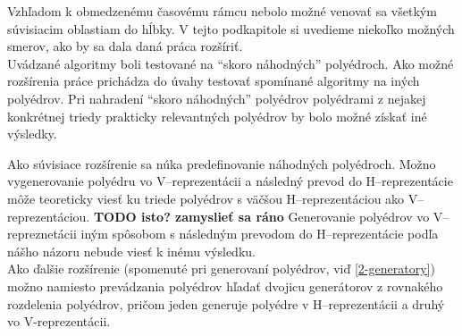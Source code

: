 Vzhľadom k obmedzenému časovému rámcu nebolo možné venovať sa všetkým súvisiacim oblastiam do hĺbky. V tejto podkapitole si uvedieme niekoľko možných smerov, ako by sa dala daná práca rozšíriť.\\

Uvádzané algoritmy boli testované na ``skoro náhodných'' polyédroch. Ako možné rozšírenia práce prichádza do úvahy testovať spomínané algoritmy na iných polyédrov. Pri nahradení ``skoro náhodných'' polyédrov polyédrami z nejakej konkrétnej triedy prakticky relevantných polyédrov by bolo možné získať iné výsledky. 

Ako súvisiace rozšírenie sa núka predefinovanie náhodných polyédroch. Možno vygenerovanie polyédru vo V--reprezentácii a následný prevod do H--reprezentácie môže teoreticky viesť ku triede polyédrov s väčšou H--reprezentáciou ako V--reprezentáciou. \textbf{TODO isto? zamyslieť sa ráno} Generovanie polyédrov vo V--repreznetácii iným spôsobom s následným prevodom do H--reprezentácie podľa nášho názoru nebude viesť k inému výsledku.\\

Ako ďalšie rozšírenie (spomenuté pri generovaní polyédrov, viď \ref{2-generatory}) možno namiesto prevádzania polyédrov hľadať dvojicu generátorov z rovnakého rozdelenia polyédrov, pričom jeden generuje polyédre v H--reprezentácii a druhý vo V-reprezentácii.







